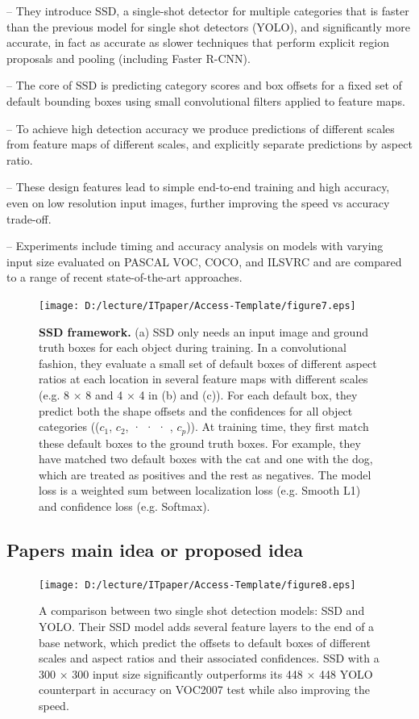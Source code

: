 \documentclass{ieeeaccess}
\begin{document}
– They introduce SSD, a single-shot detector for multiple categories that is faster than the previous model for single shot detectors (YOLO), and significantly
more accurate, in fact as accurate as slower techniques that perform explicit region proposals and pooling (including Faster R-CNN).

– The core of SSD is predicting category scores and box offsets for a fixed set of default bounding boxes using small convolutional filters applied to feature maps.

– To achieve high detection accuracy we produce predictions of different scales from feature maps of different scales, and explicitly separate predictions by aspect ratio.

– These design features lead to simple end-to-end training and high accuracy, even on low resolution input images, further improving the speed vs accuracy trade-off.

– Experiments include timing and accuracy analysis on models with varying input size evaluated on PASCAL VOC, COCO, and ILSVRC and are compared to a range of recent state-of-the-art approaches.

\begin{figure}
	\centering
		\texttt{[image: D:/lecture/ITpaper/Access-Template/figure7.eps]}
	\caption {\textbf{SSD framework.} (a) SSD only needs an input image and ground truth boxes for each object during training. In a convolutional fashion, they evaluate a small set of default boxes of different aspect ratios at each location in several feature maps with different scales (e.g. 8 × 8 and 4 × 4 in (b) and (c)). For each default box, they predict both the shape offsets and the confidences for all object categories (($c_1$, $c_2$, · · · , $c_p$)). At training time, they first match these default boxes to the ground truth boxes. For example, they have matched two default boxes with the cat and one with the dog, which are treated as positives and the rest as negatives. The model loss is a weighted sum between localization loss (e.g. Smooth L1) and confidence loss (e.g. Softmax).}
	\label{fig:figure7}
\end{figure}

\subsection{Papers main idea or proposed idea}

\begin{figure}
	\centering
		\texttt{[image: D:/lecture/ITpaper/Access-Template/figure8.eps]}
	\caption {A comparison between two single shot detection models: SSD and YOLO. Their SSD model adds several feature layers to the end of a base network, which predict the offsets to default boxes of different scales and aspect ratios and their associated confidences. SSD with a 300 × 300 input size significantly outperforms its 448 × 448 YOLO counterpart in accuracy on VOC2007 test while also improving the speed.}
	\label{fig:figure8}
\end{figure}
\end{document}
